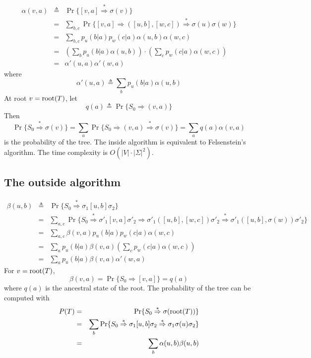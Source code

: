 \documentclass[10pt]{article}
\begin{document}
\begin{eqnarray*}
\alpha(v,a)&\triangleq&\Pr\{[v,a]\stackrel{*}{\Rightarrow}\sigma(v)\}\\
&=&\sum_{b,c}\Pr\big\{[v,a]\Rightarrow([u,b],[w,c])\stackrel{*}{\Rightarrow}\sigma(u)\sigma(w)\big\}\\
&=&\sum_{b,c}p_u(b|a)p_w(c|a)\alpha(u,b)\alpha(w,c)\\
&=&\left(\sum_b p_u(b|a)\alpha(u,b)\right)\cdot\left(\sum_c p_w(c|a)\alpha(w,c)\right)\\
&=&\alpha'(u,a)\alpha'(w,a)
\end{eqnarray*}
where
$$ \alpha'(u,a)\triangleq\sum_b p_u(b|a)\alpha(u,b) $$
At root $v={\rm root}(T)$, let
$$ q(a)\triangleq\Pr\{S_0\Rightarrow(v,a)\} $$
Then
$$
\Pr\{S_0\stackrel{*}{\Rightarrow}\sigma(v)\}=\sum_a\Pr\{S_0\Rightarrow(v,a)\stackrel{*}{\Rightarrow}\sigma(v)\}=\sum_aq(a)\alpha(v,a)
$$
is the probability of the tree.
The inside algorithm is equivalent to Felsenstein's algorithm.
The time complexity is $O(|V|\cdot|\Sigma|^2)$.

\subsection{The outside algorithm}

\begin{eqnarray*}
\beta(u,b)
&\triangleq&\Pr\{S_0\stackrel{*}{\Rightarrow}\sigma_1[u,b]\sigma_2\}\\
&=&\sum_{a,c}\Pr\big\{S_0\stackrel{*}{\Rightarrow}\sigma'_1[v,a]\sigma'_2\Rightarrow\sigma'_1([u,b],[w,c])\sigma'_2\stackrel{*}{\Rightarrow}\sigma'_1([u,b],\sigma(w))\sigma'_2\big\}\\
&=&\sum_{a,c}\beta(v,a)p_u(b|a)p_w(c|a)\alpha(w,c)\\
&=&\sum_ap_u(b|a)\beta(v,a)\left(\sum_c p_w(c|a)\alpha(w,c)\right)\\
&=&\sum_ap_u(b|a)\beta(v,a)\alpha'(w,a)
\end{eqnarray*}
For $v={\rm root}(T)$,
$$ \beta(v,a)=\Pr\{S_0\Rightarrow[v,a]\}=q(a) $$
where $q(a)$ is the ancestral state of the root. The probability of the tree
can be computed with
\begin{eqnarray*}
P(T)&=&\Pr\{S_0\stackrel{*}{\Rightarrow}\sigma({\rm root}(T))\}\\
&=&\sum_b\Pr\{S_0\stackrel{*}{\Rightarrow}\sigma_1[u,b]\sigma_2\stackrel{*}{\Rightarrow}\sigma_1\sigma(u)\sigma_2\}\\
&=&\sum_b\alpha(u,b)\beta(u,b)
\end{eqnarray*}
\end{document}
